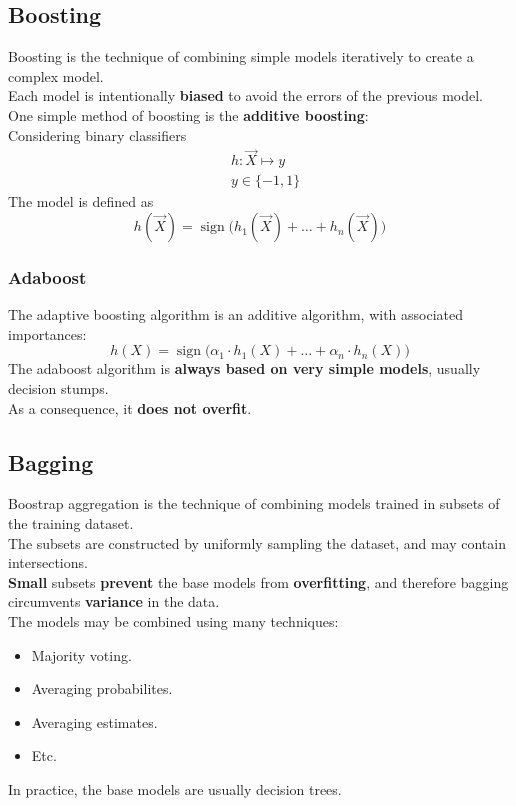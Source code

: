 \documentclass[11pt]{article}
\DeclareMathOperator{\sign}{sign}
\begin{document}
\subsection{Boosting}
\label{sec:orgf9cf24e}
Boosting is the technique of combining simple models iteratively to create a complex
model. \\
Each model is intentionally \textbf{biased} to avoid the errors of the previous model. \\

One simple method of boosting is the \textbf{additive boosting}: \\
Considering binary classifiers
\begin{align*}
  & h: \vec{X} \mapsto y \\
  & y \in \{ -1, 1 \}
\end{align*}
The model is defined as
\[
h(\vec{X}) = \sign\big(h_1(\vec{X}) + \hdots + h_n(\vec{X})\big)
\]
\subsubsection{Adaboost}
\label{sec:org26ee5c2}
The adaptive boosting algorithm is an additive algorithm, with associated importances:
\[
  h(X) = \sign\big(\alpha_1 \cdot h_1(X) + \hdots + \alpha_n \cdot h_n(X)\big)
\]
The adaboost algorithm is \textbf{always based on very simple models}, usually decision
stumps. \\
As a consequence, it \textbf{does not overfit}.
\subsection{Bagging}
\label{sec:orgba7f019}
Boostrap aggregation is the technique of combining models trained in subsets of the
training dataset. \\
The subsets are constructed by uniformly sampling the dataset, and may contain
intersections. \\
\textbf{Small} subsets \textbf{prevent} the base models from \textbf{overfitting}, and therefore bagging
circumvents \textbf{variance} in the data. \\

The models may be combined using many techniques:
\begin{itemize}[itemsep=0pt]
\item Majority voting.
\item Averaging probabilites.
\item Averaging estimates.
\item Etc.
\end{itemize}
In practice, the base models are usually decision trees.
\end{document}
